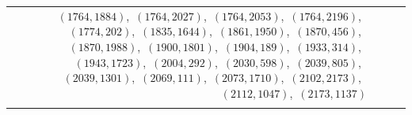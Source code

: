 \documentclass[11pt]{article}
\begin{document}
\begin{longtable}{@{}rrl>{\raggedright\arraybackslash}p{}@{}}
$(1764,1884)$,\allowbreak\ $(1764,2027)$,\allowbreak\ $(1764,2053)$,\allowbreak\ $(1764,2196)$,\allowbreak\ $(1774,202)$,\allowbreak\ $(1835,1644)$,\allowbreak\ $(1861,1950)$,\allowbreak\ $(1870,456)$,\allowbreak\ $(1870,1988)$,\allowbreak\ $(1900,1801)$,\allowbreak\ $(1904,189)$,\allowbreak\ $(1933,314)$,\allowbreak\ $(1943,1723)$,\allowbreak\ $(2004,292)$,\allowbreak\ $(2030,598)$,\allowbreak\ $(2039,805)$,\allowbreak\ $(2039,1301)$,\allowbreak\ $(2069,111)$,\allowbreak\ $(2073,1710)$,\allowbreak\ $(2102,2173)$,\allowbreak\ $(2112,1047)$,\allowbreak\ $(2173,1137)$\\
\addlinespace[3pt]
\end{longtable}
\endgroup
\end{document}
